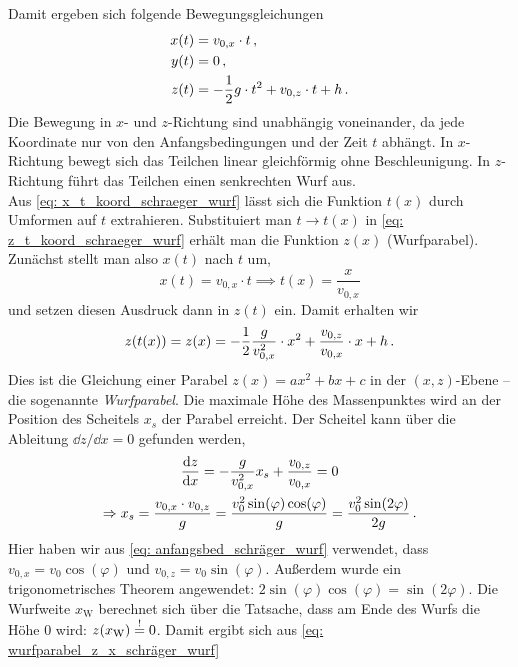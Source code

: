 Damit ergeben sich folgende Bewegungsgleichungen
\begin{align}
    x(t) &= v_{0,x} \cdot t \,{,}\, \label{eq: x_t_koord_schraeger_wurf}\\
    y(t) &= 0 \,{,}\,\\
    z(t) &= -\frac{1}{2} g \cdot t^2 + v_{0,z}\cdot t + h \,. \label{eq: z_t_koord_schraeger_wurf}
\end{align}
Die Bewegung in $x$- und $z$-Richtung sind unabhängig voneinander, da jede Koordinate nur von den Anfangsbedingungen und der Zeit $t$ abhängt. In $x$-Richtung bewegt sich das Teilchen linear gleichförmig ohne Beschleunigung. In $z$-Richtung führt das Teilchen einen senkrechten Wurf aus. \\
Aus \cref{eq: x_t_koord_schraeger_wurf} lässt sich die Funktion $t(x)$ durch Umformen auf $t$ extrahieren. Substituiert man $t \rightarrow t(x)$ in \cref{eq: z_t_koord_schraeger_wurf} erhält man die Funktion $z(x)$ (Wurfparabel). Zunächst stellt man also $x(t)$ nach $t$ um, 
\begin{equation}
    x(t) = v_{0,x}\cdot t \implies t(x) = \frac{x}{v_{0,x}}
\end{equation}
und setzen diesen Ausdruck dann in $z(t)$ ein. Damit erhalten wir
\begin{equation}\label{eq: wurfparabel_z_x_schräger_wurf}
    z(t(x)) = z(x) = - \frac{1}{2} \frac{g}{v_{0,x}^2}\cdot x^2 + \frac{v_{0,z}}{v_{0,x}}\cdot x + h \,.
\end{equation}
Dies ist die Gleichung einer Parabel $z(x) = a x^2 + b x + c$ in der $(x,z)$-Ebene -- die sogenannte \textit{Wurfparabel}. Die maximale Höhe des Massenpunktes wird an der Position des Scheitels $x_s$ der Parabel erreicht. Der Scheitel kann über die Ableitung $\dd z/\dd x = 0$ gefunden werden,
\begin{equation}\begin{gathered}
    \frac{\mathrm{d} z}{\mathrm{d} x} = - \frac{g}{v_{0,x}^2} x_s + \frac{v_{0,z}}{v_{0,x}} = 0 \\
\Rightarrow x_s = \frac{v_{0,x} \cdot v_{0,z}}{g} = \frac{v_0^2 \sin(\varphi)\cos(\varphi)}{g} = \frac{v_0^2 \sin(2\varphi)}{2g}\,.
\end{gathered}\end{equation}
Hier haben wir aus \cref{eq: anfangsbed_schräger_wurf} verwendet, dass $v_{0,x} = v_0 \cos(\varphi)$ und $v_{0,z} = v_0 \sin(\varphi)$. Außerdem wurde ein trigonometrisches Theorem angewendet: $2\sin(\varphi)\cos(\varphi) = \sin(2\varphi)$. Die Wurfweite $x_\mathrm{W}$ berechnet sich über die Tatsache, dass am Ende des Wurfs die Höhe $0$ wird: $z(x_\mathrm{W}) \stackrel{!}{=} 0$. Damit ergibt sich aus \cref{eq: wurfparabel_z_x_schräger_wurf}
